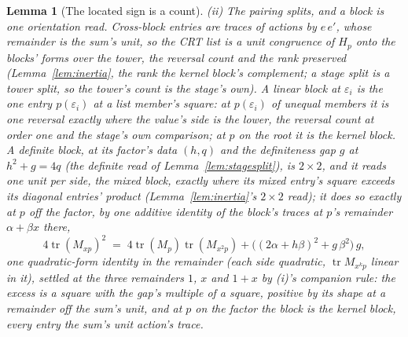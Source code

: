 \documentclass[11pt]{article}
\newtheorem{lemma}{Lemma}
\theoremstyle{definition}
\begin{document}
\begin{lemma}[The located sign is a count]
\emph{(ii) The pairing splits, and a block is one orientation read.}
Cross-block entries are traces of actions by $e\,e'$, whose remainder
is the sum's unit, so the CRT list is a unit congruence of $H_p$ onto the
blocks' forms over the tower, the
reversal count and the rank preserved (Lemma~\ref{lem:inertia}, the
rank the kernel block's complement; a stage split is a tower split, so
the tower's count is the stage's own). A linear block at
$\varepsilon_i$ is the one entry $p(\varepsilon_i)$ at a list
member's square: at $p(\varepsilon_i)$ of unequal members it is one reversal exactly where
the value's side is the lower, the reversal count at order one and the
stage's own comparison; at $p$ on the root it is the kernel
block. A definite block, at its factor's data $(h,q)$ and the
\emph{definiteness gap} $g$ at $h^2+g=4q$ (the definite read of
Lemma~\ref{lem:stagesplit}), is $2\times2$, and it reads one unit
per side, the mixed block,
exactly where its mixed entry's square exceeds its diagonal
entries' product (Lemma~\ref{lem:inertia}'s $2\times2$ read); it
does so exactly at $p$ off the factor, by one additive identity of
the block's traces at $p$'s remainder $\alpha+\beta x$ there,
\[
4\operatorname{tr}(M_{xp})^2
\;=\;4\operatorname{tr}(M_p)\operatorname{tr}(M_{x^2p})
+\big((2\alpha+h\beta)^2+g\,\beta^2\big)\,g ,
\]
one quadratic-form identity in the remainder (each side quadratic,
$\operatorname{tr}M_{x^kp}$ linear in it), settled at the three
remainders $1$, $x$ and $1+x$ by (i)'s companion rule: the excess is
a square with the gap's multiple of a square, positive by its shape
at a remainder off the sum's unit, and at $p$ on the factor the block is
the kernel block, every entry the sum's unit action's trace.


\end{lemma}
\end{document}
